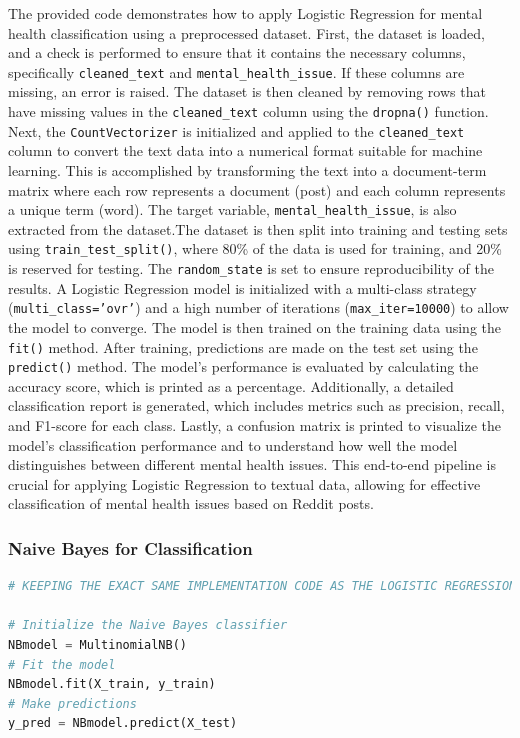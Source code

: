 \noindent
The provided code demonstrates how to apply Logistic Regression for mental health classification using a preprocessed dataset. First, the dataset is loaded, and a check is performed to ensure that it contains the necessary columns, specifically \texttt{cleaned\_text} and \texttt{mental\_health\_issue}. If these columns are missing, an error is raised. The dataset is then cleaned by removing rows that have missing values in the \texttt{cleaned\_text} column using the \texttt{dropna()} function. Next, the \texttt{CountVectorizer} is initialized and applied to the \texttt{cleaned\_text} column to convert the text data into a numerical format suitable for machine learning. This is accomplished by transforming the text into a document-term matrix where each row represents a document (post) and each column represents a unique term (word). The target variable, \texttt{mental\_health\_issue}, is also extracted from the dataset.The dataset is then split into training and testing sets using \texttt{train\_test\_split()}, where 80\% of the data is used for training, and 20\% is reserved for testing. The \texttt{random\_state} is set to ensure reproducibility of the results. A Logistic Regression model is initialized with a multi-class strategy (\texttt{multi\_class='ovr'}) and a high number of iterations (\texttt{max\_iter=10000}) to allow the model to converge. The model is then trained on the training data using the \texttt{fit()} method. After training, predictions are made on the test set using the \texttt{predict()} method. The model's performance is evaluated by calculating the accuracy score, which is printed as a percentage. Additionally, a detailed classification report is generated, which includes metrics such as precision, recall, and F1-score for each class. Lastly, a confusion matrix is printed to visualize the model's classification performance and to understand how well the model distinguishes between different mental health issues. This end-to-end pipeline is crucial for applying Logistic Regression to textual data, allowing for effective classification of mental health issues based on Reddit posts.


\subsubsection{Naive Bayes for Classification}

\begin{tcolorbox}[colback=gray!5!white, colframe=gray!80!black, boxrule=0.5pt, title=Naive Bayes for Mental Health Classification]
    \begin{lstlisting}[language=Python]
# KEEPING THE EXACT SAME IMPLEMENTATION CODE AS THE LOGISTIC REGRESSION

# Initialize the Naive Bayes classifier
NBmodel = MultinomialNB()
# Fit the model
NBmodel.fit(X_train, y_train)
# Make predictions
y_pred = NBmodel.predict(X_test)

    \end{lstlisting}
\end{tcolorbox}

